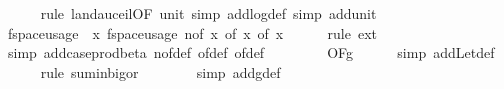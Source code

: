 \begin{isabellebody}
\ \ \ \ \isamarkupfalse%
\ {\isacharparenleft}{\kern0pt}rule\ landau{\isacharunderscore}{\kern0pt}ceil{\isacharbrackleft}{\kern0pt}OF\ unit{\isacharunderscore}{\kern0pt}{}{\isacharbrackright}{\kern0pt}{\isacharcomma}{\kern0pt}\ simp\ add{\isacharcolon}{\kern0pt}log{\isacharunderscore}{\kern0pt}def{\isacharcomma}{\kern0pt}\ simp\ add{\isacharcolon}{\kern0pt}unit{\isacharunderscore}{\kern0pt}{}{\isacharparenright}{\kern0pt}\isanewline
\isanewline
\ \ \isamarkupfalse%
\ {\isachardoublequoteopen}f{}{\isacharunderscore}{\kern0pt}space{\isacharunderscore}{\kern0pt}usage\ {\isacharequal}{\kern0pt}\ {\isacharparenleft}{\kern0pt}{\isasymlambda}x{\isachardot}{\kern0pt}\ f{}{\isacharunderscore}{\kern0pt}space{\isacharunderscore}{\kern0pt}usage\ {\isacharparenleft}{\kern0pt}n{\isacharunderscore}{\kern0pt}of\ x{\isacharcomma}{\kern0pt}\ {\isasymepsilon}{\isacharunderscore}{\kern0pt}of\ x{\isacharcomma}{\kern0pt}\ {\isasymdelta}{\isacharunderscore}{\kern0pt}of\ x{\isacharparenright}{\kern0pt}{\isacharparenright}{\kern0pt}{\isachardoublequoteclose}\isanewline
\ \ \ \ \isamarkupfalse%
\ {\isacharparenleft}{\kern0pt}rule\ ext{\isacharparenright}{\kern0pt}\isanewline
\ \ \ \ \isamarkupfalse%
\ {\isacharparenleft}{\kern0pt}simp\ add{\isacharcolon}{\kern0pt}case{\isacharunderscore}{\kern0pt}prod{\isacharunderscore}{\kern0pt}beta{\isacharprime}{\kern0pt}\ n{\isacharunderscore}{\kern0pt}of{\isacharunderscore}{\kern0pt}def\ {\isasymepsilon}{\isacharunderscore}{\kern0pt}of{\isacharunderscore}{\kern0pt}def\ {\isasymdelta}{\isacharunderscore}{\kern0pt}of{\isacharunderscore}{\kern0pt}def{\isacharparenright}{\kern0pt}\isanewline
\ \ \isamarkupfalse%
\ \isamarkupfalse%
\ {\isachardoublequoteopen}{\isachardot}{\kern0pt}{\isachardot}{\kern0pt}{\isachardot}{\kern0pt}\ {\isasymin}\ \ O{\isacharbrackleft}{\kern0pt}{\isacharquery}{\kern0pt}F{\isacharbrackright}{\kern0pt}{\isacharparenleft}{\kern0pt}g{\isacharparenright}{\kern0pt}{\isachardoublequoteclose}\isanewline
\ \ \ \ \isamarkupfalse%
\ {\isacharparenleft}{\kern0pt}simp\ add{\isacharcolon}{\kern0pt}Let{\isacharunderscore}{\kern0pt}def{\isacharparenright}{\kern0pt}\isanewline
\ \ \ \ \isamarkupfalse%
\ {\isacharparenleft}{\kern0pt}rule\ sum{\isacharunderscore}{\kern0pt}in{\isacharunderscore}{\kern0pt}bigo{\isacharunderscore}{\kern0pt}r{\isacharparenright}{\kern0pt}\ \isanewline
\ \ \ \ \ \isamarkupfalse%
\ {\isacharparenleft}{\kern0pt}simp\ add{\isacharcolon}{\kern0pt}g{\isacharunderscore}{\kern0pt}def{\isacharparenright}{\kern0pt}\isanewline

\end{isabellebody}
